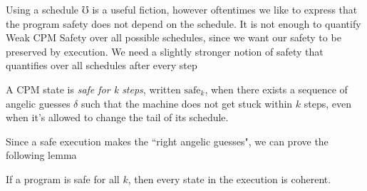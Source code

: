 Using a schedule $\mho$ is a useful fiction, however oftentimes we like to express that the program safety does not depend on the schedule. It is not enough to quantify Weak CPM Safety over all possible schedules, since we want our safety to be preserved by execution. We need a slightly stronger notion of safety that quantifies over all schedules after every step 

\begin{definition}
A CPM state is \emph{safe for k steps}, written 
$\mathrm{safe}_{k}$, when
there exists a sequence of angelic guesses $\delta$
such that the machine does not get stuck within $k$ steps, 
even when it's allowed to change the tail of its schedule.
\end{definition}

Since a safe execution makes the ``right angelic guesses", we can prove the following lemma  
\begin{lemma} If a program is safe for all $k$, then every state in the execution is coherent.
\end{lemma}






